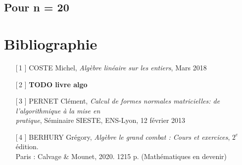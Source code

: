 \documentclass[12pt]{article}
\begin{document}
\subsection{Pour n = 20}

\newpage
\section{Bibliographie}
\begin{enumerate}

	\item[[\,1\!\!]] COSTE Michel, \textit{Algèbre linéaire sur les entiers}, Mars 2018
	\item[[\,2\!\!]] \textbf{TODO livre algo}
	\item[[\,3\!\!]] PERNET Clément, \textit{Calcul de formes normales matricielles: de
		      l'algorithmique à la mise en \\pratique}, Séminaire SIESTE, ENS-Lyon, 12 février 2013
	\item[[\,4\!\!]] BERHURY Grégory, \textit{Algèbre le grand combat : Cours et exercices},
	      $2^e$ édition.\\
	      Paris : Calvage \& Mounet, 2020. 1215 p. (Mathématiques en devenir)
\end{enumerate}
\end{document}
